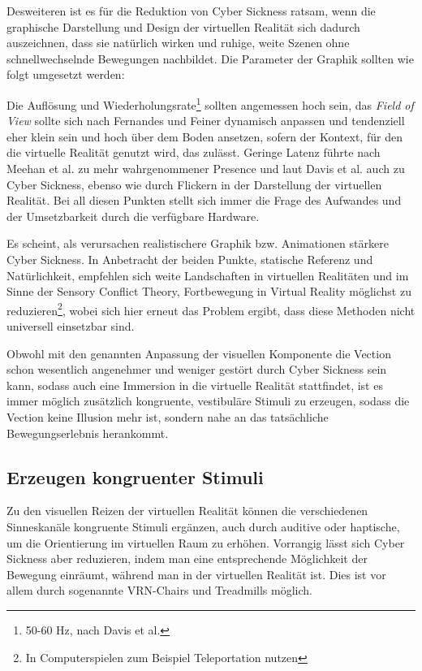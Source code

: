 Desweiteren ist es f\"ur die Reduktion von Cyber Sickness ratsam, wenn die graphische Darstellung und Design der virtuellen Realit\"at sich dadurch auszeichnen, dass sie nat\"urlich wirken und ruhige, weite Szenen ohne schnellwechselnde Bewegungen nachbildet. Die Parameter der Graphik sollten wie folgt umgesetzt werden:

Die Aufl\"osung und Wiederholungsrate\footnote{50-60 Hz, nach Davis et al.\cite{Davis:2014:Factors}} sollten angemessen hoch sein\cite{kirollos:2019:refresh}, das \textit{Field of View} sollte sich nach Fernandes und Feiner\cite{Fenandes:2016:FOV} dynamisch anpassen und tendenziell eher klein sein und hoch \"uber dem Boden ansetzen, sofern der Kontext, f\"ur den die virtuelle Realit\"at genutzt wird, das zul\"asst. Geringe Latenz f\"uhrte nach Meehan et al.\cite{Meehan:2003:latency} zu mehr wahrgenommener Presence und laut Davis et al.\cite{Davis:2014:Factors} auch zu Cyber Sickness, ebenso wie durch Flickern in der Darstellung der virtuellen Realit\"at.
Bei all diesen Punkten stellt sich immer die Frage des Aufwandes und der Umsetzbarkeit durch die verf\"ugbare Hardware.

Es scheint, als verursachen realistischere Graphik bzw. Animationen st\"arkere Cyber Sickness\cite{Pouke:2018:Realism}.
In Anbetracht der beiden Punkte, statische Referenz und Nat\"urlichkeit, empfehlen sich weite Landschaften in virtuellen Realit\"aten und im Sinne der Sensory Conflict Theory, Fortbewegung in Virtual Reality m\"oglichst zu reduzieren\footnote{In Computerspielen zum Beispiel Teleportation nutzen}, wobei sich hier erneut das Problem ergibt, dass diese Methoden nicht universell einsetzbar sind.

Obwohl mit den genannten Anpassung der visuellen Komponente die Vection schon wesentlich angenehmer und weniger gest\"ort durch Cyber Sickness sein kann, sodass auch eine Immersion in die virtuelle Realit\"at stattfindet, ist es immer m\"oglich zus\"atzlich kongruente, vestibul\"are Stimuli zu erzeugen, sodass die Vection keine Illusion mehr ist, sondern nahe an das tats\"achliche Bewegungserlebnis herankommt.

\subsection{Erzeugen kongruenter Stimuli}\label{Vestibular}

Zu den visuellen Reizen der virtuellen Realit\"at k\"onnen die verschiedenen Sinneskan\"ale kongruente Stimuli erg\"anzen, auch durch auditive oder haptische, um die Orientierung im virtuellen Raum zu erh\"ohen. Vorrangig l\"asst sich Cyber Sickness aber reduzieren, indem man eine entsprechende M\"oglichkeit der Bewegung einr\"aumt, w\"ahrend man in der virtuellen Realit\"at ist. Dies ist vor allem durch sogenannte VRN-Chairs und Treadmills m\"oglich.

